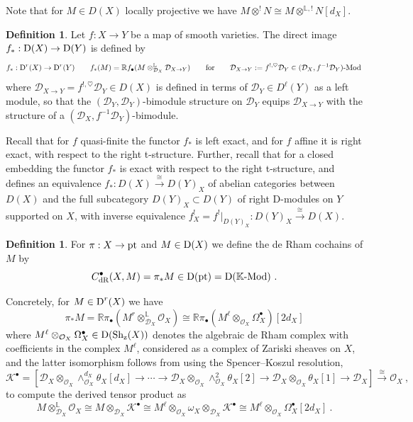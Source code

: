 \documentclass[11pt]{amsart}
\numberwithin{equation}{section}
\theoremstyle{definition}
\newtheorem{defn}[theo]{Definition}
\newcommand{\bb}{\mathbb}
\newcommand{\mc}{\mathcal}
\newcommand{\Mod}{{\textup{-Mod}}}
\newcommand{\K}{{\bb K}}
\newcommand{\dR}{{\textup{dR}}}
\newcommand{\Sh}{{\textup{Sh}}}
\newcommand{\pt}{{\textup{pt}}}
\newcommand{\z}{{\textup{z}}}
\newcommand{\0}{{\textbf{0}}}
\newcommand{\Dd}{{\textup{D}}}
\newcommand{\DD}{{D}}
\begin{document}
Note that for $M\in \DD(X)$ locally projective we have $M\otimes^! N\cong M\otimes^{\bb L,!} N[d_X]$.



\begin{defn}\label{Dmoddirim}
	Let $f:X\to Y$ be a map of smooth varieties. The direct image $f_*:\Dd(X)\to \Dd(Y)$ is defined by
	\[ f_*:\Dd^r(X)\to \Dd^r(Y)  \quad\quad  f_*(M)= \bb R f_\bullet( M\otimes^{\bb L}_{\mc D_X} \mc D_{X\to Y}) \qquad\text{for}\qquad \mc D_{X\to Y}:= f^{!,\heartsuit} \mc D_Y \in (\mc D_X,f^{-1} \mc D_Y)\text{-Mod}\, \]
	where $\mc D_{X\to Y}= f^{!,\heartsuit} \mc D_Y \in \DD(X)$ is defined in terms of $\mc D_Y\in \DD^\ell(Y)$ as a left module, so that the $(\mc D_Y, \mc D_Y)$-bimodule structure on $\mc D_Y$ equips $\mc D_{X\to Y}$ with the structure of a $(\mc D_X,f^{-1} \mc D_Y)$-bimodule.
\end{defn}

Recall that for $f$ quasi-finite the functor $f_*$ is left exact, and for $f$ affine it is right exact, with respect to the right t-structure. Further, recall that for a closed embedding the functor $f_*$ is exact with respect to the right t-structure, and defines an equivalence $f_*:\DD(X)\xrightarrow{\cong} \DD(Y)_X$ of abelian categories between $\DD(X)$ and the full subcategory $\DD(Y)_X\subset \DD(Y)$ of right D-modules on $Y$ supported on $X$, with inverse equivalence $f^!_X=f^!|_{\DD(Y)_X}:\DD(Y)_X\xrightarrow{\cong} \DD(X)$.

\begin{defn}
For $\pi:X\to \pt$ and $M\in \Dd(X)$ we define the de Rham cochains of $M$ by
\[C^\bullet_\dR(X,M)=\pi_*M \in \Dd(\pt)=\Dd(\K\Mod)  \ .\]
\end{defn}

Concretely, for $M\in \Dd^r(X)$ we have
\[ \pi_*M =\bb R\pi_\bullet( M^r\otimes^{\bb L}_{\mc D_X} \mc O_X) \cong \bb R\pi_\bullet( M^\ell \otimes_{\mc O_X} \Omega^\bullet_X )[2d_X] \]
where $ M^\ell \otimes_{\mc O_X} \Omega^\bullet_X\in \Dd(\Sh_\z(X))$ denotes the algebraic de Rham complex with coefficients in the complex $M^\ell$, considered as a complex of Zariski sheaves on $X$, and the latter isomorphism follows from using the Spencer--Koszul resolution,
\[ \mc K^\bullet=\left[ \mc D_X \otimes_{\mc O_X} \wedge^{d_X}_{\mc O_X} \theta_X[d_X] \to \cdots \to  \mc D_X \otimes_{\mc O_X} \wedge^{2}_{\mc O_X} \theta_X[2]\to  \mc D_X \otimes_{\mc O_X} \theta_X[1]\to \mc D_X \right]\xrightarrow{\cong} \mc O_X \ ,\]
to compute the derived tensor product as
\[  M\otimes^{\bb L}_{\mc D_X} \mc O_X \cong M\otimes_{\mc D_X}\mc K^\bullet \cong M^\ell\otimes_{\mc O_X} \omega_X\otimes_{\mc D_X}\mc K^\bullet \cong  M^\ell \otimes_{\mc O_X} \Omega^\bullet_X[2d_X] \ . \]
\end{document}

